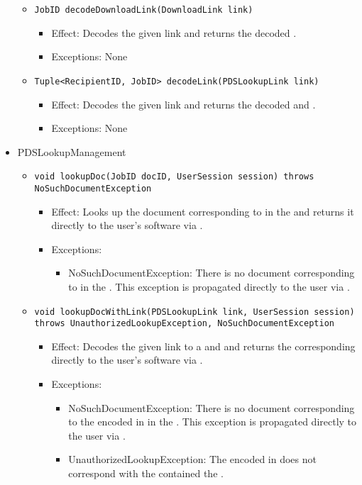 \begin{itemize}
\begin{itemize}
        \item \texttt{JobID decodeDownloadLink(DownloadLink link)}
		    \begin{itemize}
                \item Effect: Decodes the given link and returns the decoded .
                \item Exceptions: None
            \end{itemize}

		\item \texttt{Tuple<RecipientID, JobID> decodeLink(PDSLookupLink link)}
		    \begin{itemize}
                \item Effect: Decodes the given link and returns the decoded  and .
                \item Exceptions: None
            \end{itemize}
    \end{itemize}

	\item PDSLookupManagement
    \begin{itemize}
        \item \texttt{void lookupDoc(JobID docID, UserSession session) throws NoSuchDocumentException}
        \begin{itemize}
            \item Effect: Looks up the document corresponding to  in the  and returns it directly to the user's software via .
            \item Exceptions: 
			\begin{itemize}
				\item NoSuchDocumentException: There is no document corresponding to  in the . This exception is propagated directly to the user via .
			\end{itemize}
        \end{itemize}

        \item \texttt{void lookupDocWithLink(PDSLookupLink link, UserSession session) throws UnauthorizedLookupException, NoSuchDocumentException}
		    \begin{itemize}
                \item Effect: Decodes the given link to a  and  and returns the corresponding  directly to the user's software via .
                \item Exceptions: 
				\begin{itemize}
					\item NoSuchDocumentException: There is no document corresponding to the  encoded in  in the . This exception is propagated directly to the user via .
					\item UnauthorizedLookupException: The  encoded in  does not correspond with the  contained the .
				\end{itemize}
            \end{itemize}


\end{itemize}
\end{itemize}
